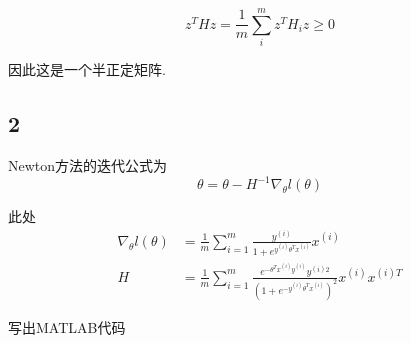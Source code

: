 \documentclass{ctexart}
\begin{document}
	\begin{equation}
		z^THz = \frac{1}{m}\sum_i^m z^TH_iz \ge 0 
	\end{equation}
	
	因此这是一个半正定矩阵.
	
	\subsection{2}
	
	Newton方法的迭代公式为
	\begin{equation}
		\theta = \theta - H^{-1} \nabla_{\theta}l(\theta)
	\end{equation}
	
	此处
	\begin{align}
		\nabla_{\theta}l(\theta) &= \frac{1}{m}\sum_{i=1}^m \frac{y^{(i)}}{1 + e^{y^{(i)}\theta^Tx^{(i)}}}x^{(i)} \\
		H &=  \frac{1}{m}\sum_{i=1}^m\frac{e^{-\theta^Tx^{(i)}y^{(i)}}y^{(i)2}}{(1 + e^{-y^{(i)}\theta^Tx^{(i)}})^2}x^{(i)}x^{(i)T} 
	\end{align}
	
	写出MATLAB代码
	
\end{document}

